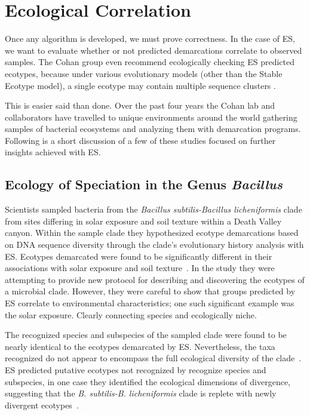 \section{Ecological Correlation}
Once any algorithm is developed, we must prove correctness.
In the case of ES, we want to evaluate whether or not predicted demarcations correlate to observed samples.
The Cohan group even recommend ecologically checking ES predicted ecotypes, because under various evolutionary models (other than the Stable Ecotype model), a single ecotype may contain multiple sequence clusters \cite{koeppel2008identifying, connor2010ecology}.

This is easier said than done.
Over the past four years the Cohan lab and collaborators have travelled to unique environments around the world gathering samples of bacterial ecosystems and analyzing them with demarcation programs.
Following is a short discussion of a few of these studies focused on further insights achieved with ES.

\subsection*{Ecology of Speciation in the Genus \emph{Bacillus}}
Scientists sampled bacteria from the \emph{Bacillus subtilis-Bacillus licheniformis} clade from sites differing in solar exposure and soil texture within a Death Valley canyon.
Within the sample clade they hypothesized ecotype demarcations based on DNA sequence diversity through the clade's evolutionary history analysis with ES.
Ecotypes demarcated were found to be significantly different in their associations with solar exposure and soil texture~\cite{connor2010ecology}.
In the study they were attempting to provide new protocol for describing and discovering the ecotypes of a microbial clade.
However, they were careful to show that groups predicted by ES correlate to environmental characteristics; one such significant example was the solar exposure.
Clearly connecting species and ecologically niche.

The recognized species and subspecies of the sampled clade were found to be nearly identical to the ecotypes demarcated by ES.
Nevertheless, the taxa recognized do not appear to encompass the full ecological diversity of the clade~\cite{connor2010ecology}.
ES predicted putative ecotypes not recognized by recognize species and subspecies, in one case they identified the ecological dimensions of divergence, suggesting that the \emph{B. subtilis-B. licheniformis} clade is replete with newly divergent ecotypes~\cite{connor2010ecology}.

